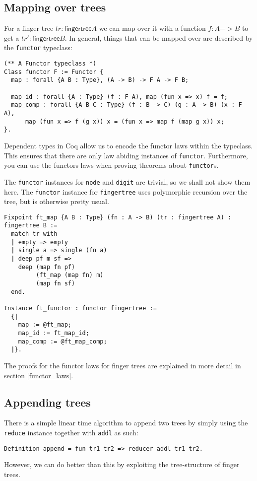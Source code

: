 \documentclass{article}
\newcommand{\code}[1]{\texttt{#1}}
\begin{document}
\subsection{Mapping over trees}\label{mapping}
For a finger tree $tr : \textsf{fingertree} A$ we can map over it
with a function $f : A -> B$ to get a $tr' : \textsf{fingertree} B$.
In general, things that can be mapped over are described by the \code{functor}
typeclass:

\begin{listing}[H]
\begin{verbatim}
(** A Functor typeclass *)
Class functor F := Functor {
  map : forall {A B : Type}, (A -> B) -> F A -> F B;

  map_id : forall {A : Type} (f : F A), map (fun x => x) f = f;
  map_comp : forall {A B C : Type} (f : B -> C) (g : A -> B) (x : F A),
      map (fun x => f (g x)) x = (fun x => map f (map g x)) x;
}.
\end{verbatim}
\end{listing}

Dependent types in Coq allow us to encode the functor laws within the typeclass.
This ensures that there are only law abiding instances of \code{functor}.
Furthermore, you can use the functors laws when proving theorems about
\code{functor}s.

The \code{functor} instances for \code{node} and \code{digit} are trivial, so
we shall not show them here. The \code{functor} instance for \code{fingertree}
uses polymorphic recursion over the tree, but is otherwise pretty usual.

\begin{listing}[H]
\begin{verbatim}
Fixpoint ft_map {A B : Type} (fn : A -> B) (tr : fingertree A) : fingertree B :=
  match tr with
  | empty => empty
  | single a => single (fn a)
  | deep pf m sf =>
    deep (map fn pf)
         (ft_map (map fn) m)
         (map fn sf)
  end.

Instance ft_functor : functor fingertree :=
  {|
    map := @ft_map;
    map_id := ft_map_id;
    map_comp := @ft_map_comp;
  |}.
\end{verbatim}
\end{listing}

The proofs for the functor laws for finger trees are explained in more detail
in section \ref{functor_laws}.

\subsection{Appending trees}
There is a simple linear time algorithm to append two trees by simply
using the \code{reduce} instance together with \code{addl} as such:
\begin{verbatim}
Definition append = fun tr1 tr2 => reducer addl tr1 tr2.
\end{verbatim}
However, we can do better than this by exploiting the tree-structure of finger
trees.
\end{document}
